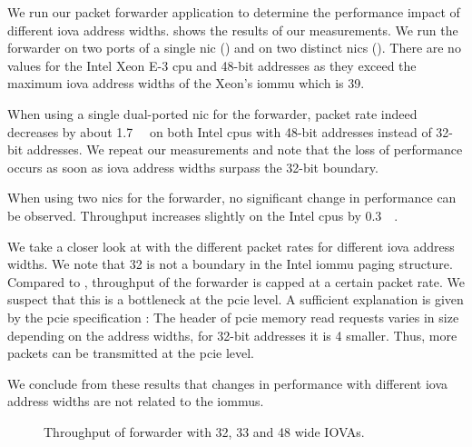 We run our packet forwarder application to determine the performance impact of
different \ac{iova} address widths. 
shows the results of our measurements. We run the forwarder on two ports of a
single \ac{nic} () and on
two distinct \acp{nic} ().
There are no values for the Intel Xeon E-3 \ac{cpu} and 48-bit addresses as they
exceed the maximum \ac{iova} address widths of the Xeon's \ac{iommu} which is
\SI{39}{\bit}.

When using a single dual-ported \ac{nic} for the forwarder, packet rate indeed
decreases by about \SI{1.7}{\mega\pps} on both Intel \acp{cpu} with 48-bit
addresses instead of 32-bit addresses. We repeat our measurements and note that
the loss of performance occurs as soon as \ac{iova} address widths surpass the
32-bit boundary.

When using two \acp{nic} for the forwarder, no significant change in performance
can be observed. Throughput increases slightly on the Intel \acp{cpu} by
\SI{0.3}{\mega\pps}.

We take a closer look at 
with the different packet rates for different \ac{iova} address widths. We note
that \SI{32}{\bit} is not a boundary in the Intel \ac{iommu} paging structure.
Compared to , throughput of
the forwarder is capped at a certain packet rate. We suspect that this is a
bottleneck at the \ac{pcie} level. A sufficient explanation is given by the
\ac{pcie} specification \cite{pcie2017specification}: The header of \ac{pcie}
memory read requests varies in size depending on the address widths, for 32-bit
addresses it is \SI{4}{\byte} smaller. Thus, more packets can be transmitted at
the \ac{pcie} level.

We conclude from these results that changes in performance with different
\ac{iova} address widths are not related to the \acp{iommu}.

\begin{figure}%
    \centering

    \caption{Throughput of forwarder with 32, 33 and \SI{48}{\bit} wide IOVAs.}
    \label{fig:iova-address-widths-throughput}
\end{figure}


